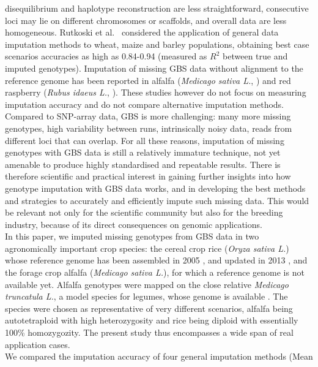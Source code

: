 disequilibrium and haplotype reconstruction 
are less straightforward, consecutive loci may lie on different chromosomes
or scaffolds, and overall data are less homogeneous.
Rutkoski et al.~\cite{rutkoski_imputation_2013}
considered the application of general data imputation methods 
to wheat, maize and barley populations, obtaining best case scenarios accuracies 
as high as 0.84-0.94 (measured as $R^{2}$ between true and imputed genotypes).
Imputation of missing GBS data without alignment to the reference genome has
been reported in alfalfa (\emph{Medicago sativa L.}, \cite{Rocher_validation_2015})
and red raspberry (\emph{Rubus idaeus L.}, \cite{ward_saturated_2013}). These studies
however do not focus on measuring imputation accuracy and do not compare
alternative imputation methods.\\
		Compared to SNP-array data, GBS is more challenging: many more 
	missing genotypes, high variability between runs, intrinsically noisy data, 
	reads from different loci that can overlap. For all these reasons, imputation 
	of missing genotypes with GBS data is still a relatively immature technique, 
	not yet amenable to produce highly standardised and repeatable results. 
There is therefore scientific and practical interest in gaining further 
insights into how genotype imputation with GBS data works, and in 
developing the best methods and strategies to accurately and efficiently 
impute such missing data. This would be relevant not only for the scientific 
community but also for the breeding industry, because of its direct 
consequences on genomic applications.\\
In this paper, we imputed missing genotypes from GBS data in two agronomically
important crop species:
the cereal crop rice (\emph{Oryza sativa L.}) whose reference genome has been 
assembled in 2005 \cite{international_rice_genome_sequencing_project_map-based_2005},
and updated in 2013 \cite{kawahara_improvement_2013},
and
the forage crop alfalfa (\emph{Medicago sativa L.}), for 
which a reference genome is not available yet. Alfalfa genotypes
were mapped on the close relative \emph{Medicago truncatula L.}, a model species
for legumes, whose genome is available \cite{young_medicago_2011}.
The species were chosen as representative of very different scenarios, alfalfa being autotetraploid
with high heterozygosity and rice being diploid with essentially 100\% homozygozity.
The present study thus encompasses a wide span of real application cases.\\
We compared the imputation accuracy of four general imputation methods (Mean
